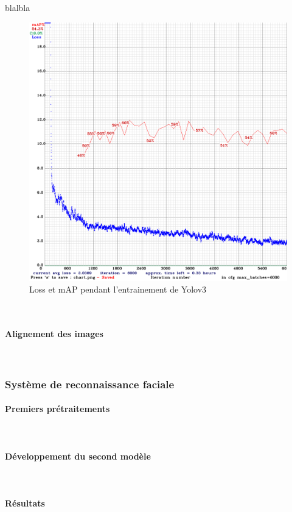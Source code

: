 \documentclass[12pt,a4paper]{report}
\begin{document}
\begin{spacing}{1.5}
blalbla

\begin{figure}[H]
\includegraphics[scale=0.44]{figures/sortie/yolov4/chart.png}
\caption{Loss et mAP pendant l'entrainement de Yolov3}
\end{figure}\\


\paragraph{Alignement des images}\mbox{}\\
\newpage
\subsubsection{Système de reconnaissance faciale}
\newpage
\paragraph{Premiers prétraitements} \mbox{}\\
\newpage
\paragraph{Développement du second modèle}\mbox{}\\
\newpage
\paragraph{Résultats}\mbox{}\\
\newpage


\end{spacing}
\end{document}
